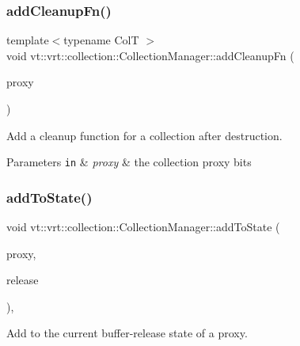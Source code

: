 \subsubsection{\texorpdfstring{add\+Cleanup\+Fn()}{addCleanupFn()}}
{\footnotesize\ttfamily template$<$typename ColT $>$ \\
void vt\+::vrt\+::collection\+::\+Collection\+Manager\+::add\+Cleanup\+Fn (\begin{DoxyParamCaption}\item[{\hyperlink{namespacevt_a1b417dd5d684f045bb58a0ede70045ac}{Virtual\+Proxy\+Type}}]{proxy }\end{DoxyParamCaption})}



Add a cleanup function for a collection after destruction. 


\begin{DoxyParams}[1]{Parameters}
\mbox{\tt in}  & {\em proxy} & the collection proxy bits \\
\hline
\end{DoxyParams}
\mbox{\label{structvt_1_1vrt_1_1collection_1_1_collection_manager_ae3dd7660105118c1ee14a125104313c6}} 
\subsubsection{\texorpdfstring{add\+To\+State()}{addToState()}}
{\footnotesize\ttfamily void vt\+::vrt\+::collection\+::\+Collection\+Manager\+::add\+To\+State (\begin{DoxyParamCaption}\item[{\hyperlink{namespacevt_a1b417dd5d684f045bb58a0ede70045ac}{Virtual\+Proxy\+Type}}]{proxy,  }\item[{\hyperlink{namespacevt_1_1vrt_1_1collection_a2545006e681bacc1f00be9d5d6bdc8fa}{Buffer\+Release\+Enum}}]{release }\end{DoxyParamCaption})\hspace{0.3cm}{\ttfamily [inline]}, {\ttfamily [private]}}



Add to the current buffer-\/release state of a proxy. 


